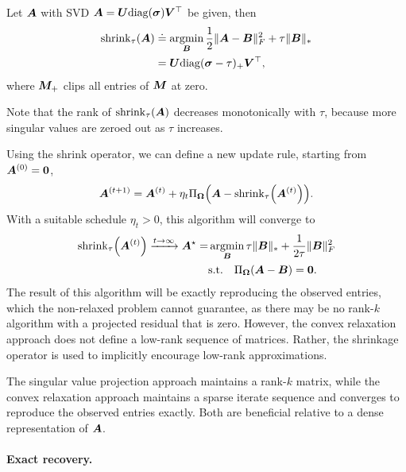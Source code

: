 \begin{theorem}
    Let $\bm{A}$ with SVD $\bm{A} = \bm{U} \mathrm{diag}(\bm{\sigma}) \bm{V}^\top$ be given, then
    \begin{align*}
        \mathrm{shrink}_{\tau}(\bm{A}) & \doteq \operatorname*{argmin}_{\bm{B}} \frac{1}{2} \| \bm{A} - \bm{B} \|_F^2 + \tau \| \bm{B} \|_* \\
                                        & = \bm{U}\mathrm{diag}(\bm{\sigma} - \tau)_+ \bm{V}^\top,
    \end{align*}
    where $\bm{M}_+$ clips all entries of $\bm{M}$ at zero.
\end{theorem}
Note that the rank of $\mathrm{shrink}_{\tau}(\bm{A})$ decreases monotonically with $\tau$, because
more singular values are zeroed out as $\tau$ increases.

Using the shrink operator, we can define a new update rule, starting from $\bm{A}^{(0)} =
    \bm{0}$, \[
    \mat{A}^{(t+1)} = \mat{A}^{(t)} + \eta_t \Pi_{\mat{\Omega}}\lft( \mat{A} - \mathrm{shrink}_{\tau}\lft( \mat{A}^{(t)} \rgt) \rgt).
\]
With a suitable schedule $\eta_t > 0$, this algorithm will converge to
\begin{align*}
    \mathrm{shrink}_{\tau}\lft( \mat{A}^{(t)} \rgt) \xrightarrow{t\to \infty} \mat{A}^\star = & \argmin_{\mat{B}} \tau \| \mat{B} \|_* + \frac{1}{2\tau} \| \mat{B} \|_F^2 \\
                                                                                              & \mathrm{s.t.} \quad \Pi_{\mat{\Omega}}(\mat{A} - \mat{B}) = \mat{0}.
\end{align*}
The result of this algorithm will be exactly reproducing the observed entries, which the non-relaxed
problem cannot guarantee, as there may be no rank-$k$ algorithm with a projected residual that is
zero. However, the convex relaxation approach does not define a low-rank sequence of matrices.
Rather, the shrinkage operator is used to implicitly encourage low-rank approximations.

\begin{important}
    The singular value projection approach maintains a rank-$k$ matrix, while the convex
    relaxation approach maintains a sparse iterate sequence and converges to reproduce the observed
    entries exactly. Both are beneficial relative to a dense representation of $\bm{A}$.
\end{important}

\paragraph{Exact recovery.}

